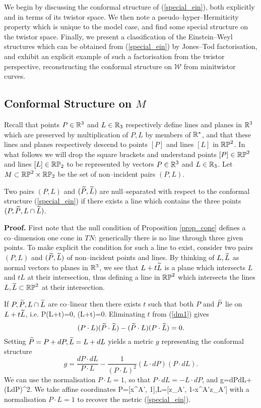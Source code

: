 We begin by discussing the  conformal structure
of (\ref{special_ein}), both explicitly and in terms of its twistor space. We then note a pseudo--hyper--Hermiticity property which is unique to the model case, and find some special structure on the twistor space. Finally, we present a classification of the Einstein--Weyl structures which can be obtained from (\ref{special_ein}) by Jones--Tod factorisation, and exhibit an explicit example of such a factorisation from the twistor perspective, reconstructing the conformal structure on $\mathcal{W}$ from minitwistor curves.
\subsection{Conformal Structure on $M$}
\label{model_conf}
Recall that points $P\in\mathbb{R}^3$ and $L\in\mathbb{R}_3$ respectively define lines and planes in $\mathbb{R}^3$ which are preserved by multiplication of $P,L$ by members of $\mathbb{R}^*$, and that these lines and planes respectively descend to points $[P]$ and lines $[L]$ in $\mathbb{RP}^2$. In what follows we will drop the square brackets and understand points $[P]\in\mathbb{RP}^2$ and lines $[L]\in\mathbb{RP}_2$ to be represented by vectors $P\in\mathbb{R}^3$ and $L\in\mathbb{R}_3$. Let $M\subset \mathbb{RP}^2\times {\mathbb{RP}_2}$ be the set of non--incident pairs 
$(P, L)$.
\begin{prop}
\label{prop_cone}
Two pairs $(P, L)$ and $(\widetilde{P}, \widetilde{L})$ are null--separated
with respect to the conformal structure (\ref{special_ein})
if there exists
a line which contains the three points $(P, \widetilde{P}, L\cap \widetilde{L})$. 
\end{prop}
{\bf Proof.}
First note that the  null condition of Proposition \ref{prop_cone}
defines a co--dimension one cone in $TN$: 
generically there is no line through three given points. To make explicit the condition for such a line to exist, consider two pairs  $(P, L)$ and $(\widetilde{P}, \widetilde{L})$ 
of non--incident points and lines. By thinking of $L,\widetilde{L}$ as normal vectors to planes in $\mathbb{R}^3$, we see that $L+t\widetilde{L}$ is a plane which intersects $L$ and $tL$ at their intersection, thus defining a line in $\mathbb{RP}^2$ which intersects the lines $L,\widetilde{L}\subset\mathbb{RP}^2$ at their intersection.

If $P,\widetilde{P},L\cap\widetilde{L}$ are co--linear then there exists $t$ such that both $P$ and $\widetilde{P}$ lie on $L+t\widetilde{L}$, i.e.
\be
\label{dm1}
P\cdot (L+t\tL)=0,  \quad
\tP\cdot (L+t\tL)=0.
\ee 
Eliminating $t$ from 
(\ref{dm1}) gives
\[
(P\cdot L)(\widetilde{P}\cdot \widetilde{L})-(\widetilde{P}\cdot L)(P\cdot \widetilde{L})=0.
\]
Setting $\widetilde{P}=P+dP, \widetilde{L}=L+dL$ yields a metric 
$g$  representing the conformal structure
\[
g=\frac{dP\cdot dL}{P\cdot L}-\frac{1}{(P\cdot L)^2}(L\cdot dP)(P\cdot dL).
\]
We can use the normalisation $P\cdot L=1$, so that $P\cdot dL=-L\cdot dP$,
and
\be
\label{dm_metric}
g={dP\cdot dL}+(L\cdot dP)^2.
\ee
We take affine coordinates 
\be
\label{DM_parameter}
P=[x^{A'}, 1],\quad L=[z_{A'}, 1-x^{A'}z_{A'}]
\ee 
with a normalisation $P\cdot L=1$ to recover the metric (\ref{special_ein}).
\koniec
